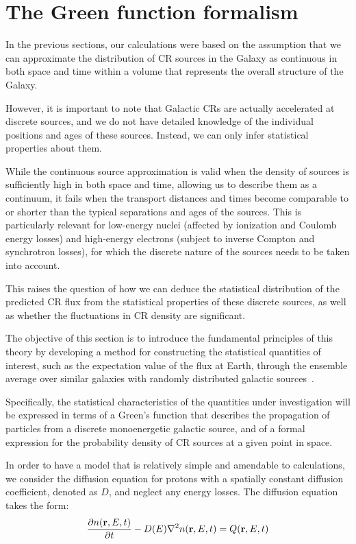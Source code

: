 \section{The Green function formalism}
\label{sec:green}
In the previous sections, our calculations were based on the assumption that we can approximate the distribution of CR sources in the Galaxy as continuous in both space and time within a volume that represents the overall structure of the Galaxy.

However, it is important to note that Galactic CRs are actually accelerated at discrete sources, and we do not have detailed knowledge of the individual positions and ages of these sources. Instead, we can only infer statistical properties about them.

While the continuous source approximation is valid when the density of sources is sufficiently high in both space and time, allowing us to describe them as a continuum, it fails when the transport distances and times become comparable to or shorter than the typical separations and ages of the sources. This is particularly relevant for low-energy nuclei (affected by ionization and Coulomb energy losses) and high-energy electrons (subject to inverse Compton and synchrotron losses), for which the discrete nature of the sources needs to be taken into account.

This raises the question of how we can deduce the statistical distribution of the predicted CR flux from the statistical properties of these discrete sources, as well as whether the fluctuations in CR density are significant. 

The objective of this section is to introduce the fundamental principles of this theory by developing a method for constructing the statistical quantities of interest, such as the expectation value of the flux at Earth, through the ensemble average over similar galaxies with randomly distributed galactic sources~\cite{Lee1979apj,Ptuskin2006asr,Evoli2021prdb}.

Specifically, the statistical characteristics of the quantities under investigation will be expressed in terms of a Green's function that describes the propagation of particles from a discrete monoenergetic galactic source, and of a formal expression for the probability density of CR sources at a given point in space.

In order to have a model that is relatively simple and amendable to calculations, we consider the diffusion equation for protons with a spatially constant diffusion coefficient, denoted as $D$, and neglect any energy losses. The diffusion equation takes the form:
%
\begin{equation}
\frac{\partial n(\vb r, E, t)}{\partial t} - D(E) \nabla^2 n(\vb r, E, t) = Q(\vb r, E, t)
\end{equation}

